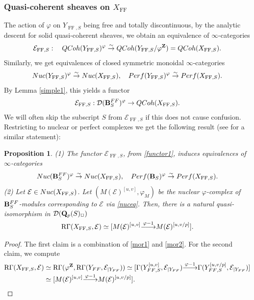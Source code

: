 \documentclass[10pt,reqno]{amsart}
\let\cal\mathcal
\newtheorem{proposition}[equation]{Proposition}
\theoremstyle{definition}
\theoremstyle{remark}
\def\lomapr#1{\smash{\mathop{\relbar\joinrel\longrightarrow}\limits^{#1}}}
\def\phi{\varphi}
\newcommand{\dr}{\operatorname{dR} }
\newcommand{\syn}{\operatorname{syn} }
\newcommand{\proeet}{\operatorname{pro\acute{e}t} }
\newcommand{\hk}{\operatorname{HK} }
\newcommand{\FF}{\operatorname{FF} }
\newcommand{\se}{{\mathcal{E}}}
\newcommand{\sd}{{\mathcal{D}}}
\numberwithin{equation}{section}
\def\R{{\mathrm R}}
\def\Q{{\bf Q}} \def\Z{{\bf Z}}
\def\EEE{${\cal E}_{\dr}$, ${\cal E}_{\rm FF}$, ${\cal E}_{\hk}$, ${\cal E}_{\proeet}$, ${\cal E}_{\syn}$}
\numberwithin{equation}{section}
\begin{document}
\subsubsection{Quasi-coherent sheaves on $X_{\FF}$}
The action of $\phi$ on $Y_{\FF,S}$ being free and totally discontinuous,  by the analytic descent for solid quasi-coherent sheaves, 
we obtain an equivalence \index{E@\EEE}of $\infty$-categories
$$\se_{\FF,S}:\quad {\rm QCoh}(Y_{\FF,S})^{\phi} \stackrel{\sim}{\to} {\rm QCoh}(Y_{\FF,S}/\phi^{\Z})={\rm QCoh}(X_{\FF,S}).
 $$
 Similarly, we get equivalences of closed symmetric monoidal $\infty$-categories
 \begin{equation}\label{mor2}
 {\rm Nuc}(Y_{\FF,S})^{\phi} \stackrel{\sim}{\to} {\rm Nuc}(X_{\FF,S}),\quad {\rm Perf}(Y_{\FF,S})^{\phi} \stackrel{\sim}{\to} {\rm Perf}(X_{\FF,S}).
 \end{equation}
By Lemma \ref{simple1},  this yields a functor
\begin{equation}\label{functor1}
 \se_{\FF,S}: \sd(\B^{\rm FF}_{S})^{\phi} \to {\rm QCoh}(X_{\FF,S}). 
 \end{equation}
We will often skip the subscript $S$ from $ \se_{\FF,S}$ if this does not cause confusion. Restricting to  nuclear or perfect complexes  we get the following result (see  \cite[Th.\,6.8]{GB2} for a similar statement):
\begin{proposition}\label{leje1}
{\rm (1)} The functor $\se_{\FF,S}$, from  \eqref{functor1}, induces  equivalences of $\infty$-categories
\begin{equation}\label{nuceq}
 {\rm Nuc}(\B^{\rm FF}_S)^{\phi}\stackrel{\sim}{\to} {\rm Nuc}(X_{\FF,S}), \quad 
 {\rm Perf}(\B_S)^{\phi}\stackrel{\sim}{\to} {\rm Perf}(X_{\FF,S}).
 \end{equation}
{\rm (2)} Let  $\se\in{\rm  Nuc}(X_{\FF,S})$.  Let $(M (\se)^{[u,v]}, \phi_M)$ be the  nuclear $\phi$-complex of $\B^{\rm FF}_S$-modules
corresponding to $\se$ via \eqref{nuceq}. Then, there
is a natural quasi-isomorphism in $\sd(\Q_{p}(S)_{\Box})$ 
$$\R\Gamma(X_{\FF,S}, \se) \simeq [M(\se)^{[u,v]}\lomapr{\phi-1} M(\se)^{[u,v/p]}].
 $$
 \end{proposition}
 \begin{proof}The first claim is a combination of \eqref{mor1} and \eqref{mor2}. 
 For the second claim, we compute
 \begin{align*}
 \R\Gamma(X_{\FF,S}, \se)  & \simeq \R\Gamma(\phi^{\Z}, \R\Gamma(Y_{\rm FF},\se_{|Y_{\rm FF}}))
 \simeq [\Gamma(Y_{{\rm FF},S}^{[u,v]},\se_{|Y_{\rm FF}})\lomapr{\phi-1} \Gamma(Y_{{\rm FF},S}^{[u,v/p]},
\se_{|Y_{\rm FF}})] \\ &\simeq [M(\se)^{[u,v]}\lomapr{\phi-1} M(\se)^{[u,v/p]}].
 \end{align*}
 \end{proof}
\end{document}
